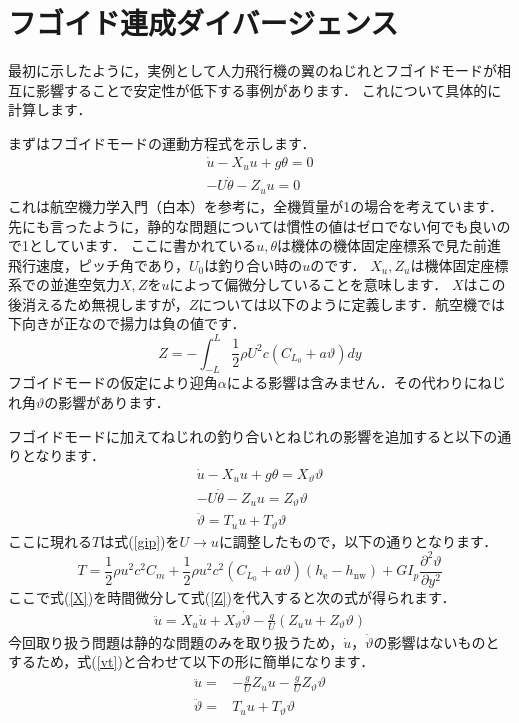 \documentclass{jarticle}
\begin{document}
\section{フゴイド連成ダイバージェンス}

最初に示したように，実例として人力飛行機の翼のねじれとフゴイドモードが相互に影響することで安定性が低下する事例があります．
これについて具体的に計算します．

まずはフゴイドモードの運動方程式を示します．
\begin{align} 
    \dot{u} - X_u u + g \theta = 0\\
    -U\dot{\theta} - Z_u u = 0
\end{align}
これは航空機力学入門（白本）を参考に，全機質量が1の場合を考えています．先にも言ったように，静的な問題については慣性の値はゼロでない何でも良いので1としています．
ここに書かれている$u,\theta$は機体の機体固定座標系で見た前進飛行速度，ピッチ角であり，$U_0$は釣り合い時の$u$のです．
$X_u,Z_u$は機体固定座標系での並進空気力$X,Z$を$u$によって偏微分していることを意味します．
$X$はこの後消えるため無視しますが，$Z$については以下のように定義します．航空機では下向きが正なので揚力は負の値です．
\begin{equation}
    Z = -\int_{-L}^L \frac{1}{2}\rho U^2 c (C_{L_0} + a\vartheta) dy
\end{equation}
フゴイドモードの仮定により迎角$\alpha$による影響は含みません．その代わりにねじれ角$\vartheta$の影響があります．

フゴイドモードに加えてねじれの釣り合いとねじれの影響を追加すると以下の通りとなります．
\begin{align} 
    \dot{u} - X_u u + g \theta = X_\vartheta \vartheta \label{X}\\
    -U\dot{\theta} - Z_u u = Z_\vartheta \vartheta \label{Z} \\
    \ddot{\vartheta} = T_u u + T_\vartheta \vartheta \label{vt}
\end{align}
ここに現れる$T$は式(\ref{gip})を$U \rightarrow u$に調整したもので，以下の通りとなります．
\begin{equation}
    T = \frac{1}{2}\rho u^2 c^2 C_m + \frac{1}{2}\rho u^2 c^2 (C_{L_0} + a\vartheta)  (h_\mathrm{e}-h_\mathrm{nw}) + GI_p \frac{\partial^2 \vartheta}{\partial y^2}
\end{equation}
ここで式(\ref{X})を時間微分して式(\ref{Z})を代入すると次の式が得られます．
\begin{align}
    \ddot{u} = X_u \dot{u} + X_\vartheta \dot{\vartheta} - \frac{g}{U} (Z_u u + Z_\vartheta \vartheta) 
\end{align}
今回取り扱う問題は静的な問題のみを取り扱うため，$\dot{u}，\dot{\vartheta}$の影響はないものとするため，式(\ref{vt})と合わせて以下の形に簡単になります．
\begin{align}
    \ddot{u} =&  - \frac{g}{U}Z_u u - \frac{g}{U}Z_\vartheta \vartheta \\
    \ddot{\vartheta} =& T_u u + T_\vartheta \vartheta
\end{align}
\end{document}
